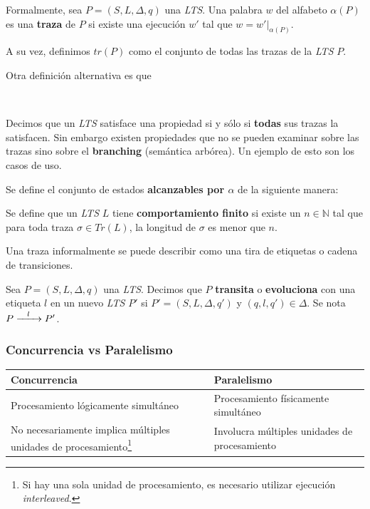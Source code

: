 \documentclass[]{article}
\begin{document}
Formalmente, sea $P = (S,L,\Delta,q)$ una \textit{LTS}. Una palabra $w$ del alfabeto $\alpha(P)$ es una \textbf{traza} de $P$ si existe una ejecución $w'$ tal que $\displaystyle w=w'|_{\alpha(P)}$.

A su vez, definimos $tr(P)$ como el conjunto de todas las trazas de la \textit{LTS} $P$.
\begin{center}
\end{center}

Otra definición alternativa es que
\begin{center}
	\\
\end{center}

Decimos que un \textit{LTS} satisface una propiedad si y sólo si \textbf{todas} sus trazas la satisfacen. Sin embargo existen propiedades que no se pueden examinar sobre las trazas sino sobre el \textbf{branching} (semántica arbórea). Un ejemplo de esto son los casos de uso.

Se define el conjunto de estados \textbf{alcanzables por $\alpha$} de la siguiente manera:
\begin{center}
\end{center}

Se define que un \textit{LTS} $L$ tiene \textbf{comportamiento finito} si existe un $n\in \mathbb{N}$ tal que para toda traza $\sigma \in Tr(L)$, la longitud de $\sigma$ es menor que $n$.

Una traza informalmente se puede describir como una tira de etiquetas o cadena de transiciones.

Sea $P = (S,L,\Delta,q)$ una \textit{LTS}. Decimos que $P$ \textbf{transita} o \textbf{evoluciona} con una etiqueta $l$ en un nuevo \textit{LTS} $P'$ si $P'=(S,L,\Delta,q')$ y $(q,l,q')\in\Delta$. Se nota $P \xrightarrow{\hspace*{0.3cm} l \hspace*{0.3cm}} P'$.


\subsubsection{Concurrencia vs Paralelismo}
\begin{savenotes}
\begin{center}
	\begin{tabular}{|p{6cm}|p{6cm}|}
		\hline
		\textbf{Concurrencia} &  \textbf{Paralelismo}\\ \hline \hline
		Procesamiento lógicamente simultáneo & Procesamiento físicamente simultáneo\\ \hline
		No necesariamente implica múltiples unidades de procesamiento\footnote{Si hay una sola unidad de procesamiento, es necesario utilizar ejecución \textit{interleaved}.} & Involucra múltiples unidades de procesamiento\\ \hline
	\end{tabular}
\end{center}
\end{savenotes}
\end{document}
